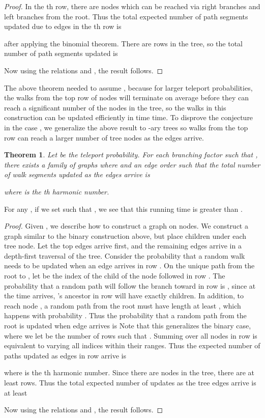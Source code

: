 \documentclass{article}
\newtheorem{thm}{Theorem}
\begin{document}
\begin{proof}
In the th row, there are  nodes which can be reached via  right branches and  left branches from the root.  Thus the total expected number of path segments updated due to edges in the th row is

after applying the binomial theorem.
 There are  rows in the tree, so the total number of path segments updated is

Now using the relations  and , the result follows.
\end{proof}

The above theorem needed to assume , because for larger teleport probabilities, the walks from the top row of nodes will terminate on average before they can reach a significant number of the nodes in the tree, so the walks in this construction can be updated efficiently in time  time.  To disprove the conjecture in the case , we  generalize the above result to -ary trees so walks from the top row can reach a larger number of tree nodes as the edges arrive.

\begin{thm} Let  be the teleport probability.  For each branching factor  such that  , there exists a family of graphs where  and an edge order such that the total number of walk segments updated as the edges arrive is 

where  is the th harmonic number.
\end{thm}
For any , if we set  such that , we see that this running time is greater than
.  

\begin{proof}
  Given , we describe how to construct a graph on  nodes.  We construct a graph similar to the binary construction above, but place  children under each tree node.  Let the  top edges arrive first, and the remaining edges arrive in a depth-first traversal of the tree.  Consider the probability that a random walk needs to be updated when an edge  arrives in row .  On the unique path from the root to , let  be the index of the child of the node followed in row .  The probability that a random path will follow the branch toward  in row  is , since at the time  arrives, 's ancestor in row  will have exactly  children.  In addition, to reach node , a random path from the root must have  length at least , which happens with probability .  Thus the probability that a random path from the root is updated when edge  arrives is 
Note that this generalizes the binary case, where we let  be the number of rows  such that .  Summing over all nodes  in row  is equivalent to varying all indices  within their ranges.  Thus the expected number of paths updated as edges in row  arrive is

where  is the th harmonic number.
Since there are  nodes in the tree, there are at least  rows.  Thus the total expected number of updates as the  tree edges arrive is at least

Now using the relations  and , the result follows.
\end{proof}
\end{document}
